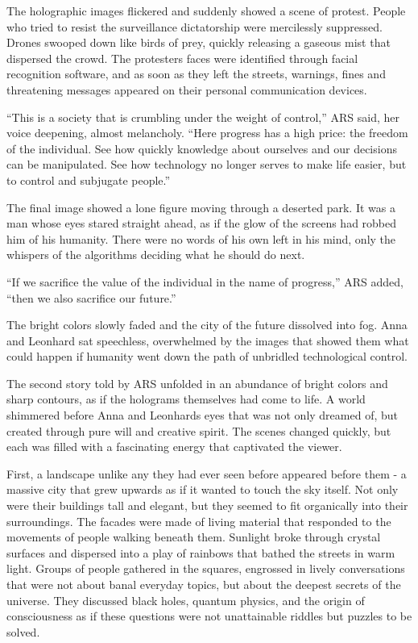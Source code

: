 \documentclass[
]{article}
\begin{document}
The holographic images flickered and suddenly showed a scene of protest.
People who tried to resist the surveillance dictatorship were
mercilessly suppressed. Drones swooped down like birds of prey, quickly
releasing a gaseous mist that dispersed the crowd. The
protesters\textquotesingle{} faces were identified through facial
recognition software, and as soon as they left the streets, warnings,
fines and threatening messages appeared on their personal communication
devices.

``This is a society that is crumbling under the weight of control,'' ARS
said, her voice deepening, almost melancholy. ``Here progress has a high
price: the freedom of the individual. See how quickly knowledge about
ourselves and our decisions can be manipulated. See how technology no
longer serves to make life easier, but to control and subjugate
people.''

The final image showed a lone figure moving through a deserted park. It
was a man whose eyes stared straight ahead, as if the glow of the
screens had robbed him of his humanity. There were no words of his own
left in his mind, only the whispers of the algorithms deciding what he
should do next.

``If we sacrifice the value of the individual in the name of progress,''
ARS added, ``then we also sacrifice our future.''

The bright colors slowly faded and the city of the future dissolved into
fog. Anna and Leonhard sat speechless, overwhelmed by the images that
showed them what could happen if humanity went down the path of
unbridled technological control.

The second story told by ARS unfolded in an abundance of bright colors
and sharp contours, as if the holograms themselves had come to life. A
world shimmered before Anna and Leonhard\textquotesingle s eyes that was
not only dreamed of, but created through pure will and creative spirit.
The scenes changed quickly, but each was filled with a fascinating
energy that captivated the viewer.

First, a landscape unlike any they had ever seen before appeared before
them - a massive city that grew upwards as if it wanted to touch the sky
itself. Not only were their buildings tall and elegant, but they seemed
to fit organically into their surroundings. The facades were made of
living material that responded to the movements of people walking
beneath them. Sunlight broke through crystal surfaces and dispersed into
a play of rainbows that bathed the streets in warm light. Groups of
people gathered in the squares, engrossed in lively conversations that
were not about banal everyday topics, but about the deepest secrets of
the universe. They discussed black holes, quantum physics, and the
origin of consciousness as if these questions were not unattainable
riddles but puzzles to be solved.
\end{document}
